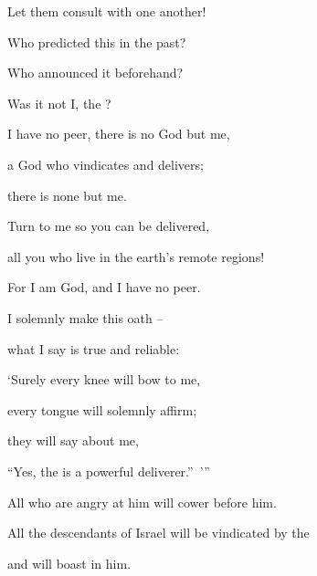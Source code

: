 {\par }{\Q Let
them consult
with one another!
\par }{\Q Who
predicted
this
in the past?
\par }{\Q Who announced
it beforehand?
\par }{\Q Was it not
I,
the {}?
\par }{\Q I have no
peer,
there is no God
but
me,
\par }{\Q a God
who vindicates
and delivers;
\par }{\Q there is none
but me.
\par }{\Q {}Turn
to me
so you can be delivered,
\par }{\Q all
you who live in the earth’s
remote regions!
\par }{\Q For
I am
God,
and I have no
peer.
\par }{\Q {}I solemnly make this oath –
\par }{\Q what I say is true and reliable:
\par }{\Q ‘Surely every knee will bow to me,
\par }{\Q every tongue will solemnly affirm;
\par }{\Q {}they will say
about me,
\par }{\Q “Yes, the
{}
is a powerful
deliverer.” ’”

\par }{\Q All
who are angry
at him will cower before him.
\par }{\Q {}All
the descendants
of Israel
will be vindicated
by the
{}
\par }{\Q and will boast in him.

\par }
